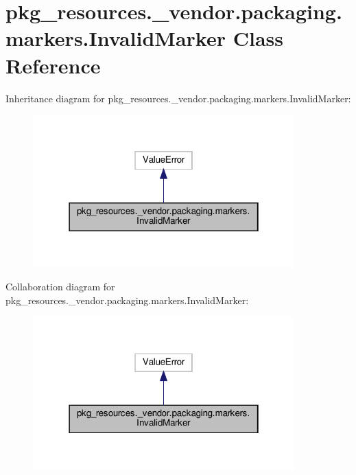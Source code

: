 \hypertarget{classpkg__resources_1_1__vendor_1_1packaging_1_1markers_1_1InvalidMarker}{}\section{pkg\+\_\+resources.\+\_\+vendor.\+packaging.\+markers.\+Invalid\+Marker Class Reference}
\label{classpkg__resources_1_1__vendor_1_1packaging_1_1markers_1_1InvalidMarker}


Inheritance diagram for pkg\+\_\+resources.\+\_\+vendor.\+packaging.\+markers.\+Invalid\+Marker\+:
\nopagebreak
\begin{figure}[H]
\begin{center}
\leavevmode
\includegraphics[width=286pt]{classpkg__resources_1_1__vendor_1_1packaging_1_1markers_1_1InvalidMarker__inherit__graph}
\end{center}
\end{figure}


Collaboration diagram for pkg\+\_\+resources.\+\_\+vendor.\+packaging.\+markers.\+Invalid\+Marker\+:
\nopagebreak
\begin{figure}[H]
\begin{center}
\leavevmode
\includegraphics[width=286pt]{classpkg__resources_1_1__vendor_1_1packaging_1_1markers_1_1InvalidMarker__coll__graph}
\end{center}
\end{figure}


